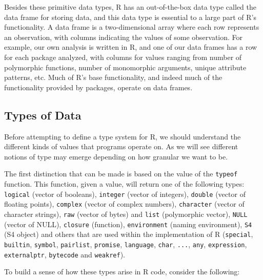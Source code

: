 \documentclass[acmsmall,10pt,review,anonymous]{acmart}\settopmatter{printfolios=true,printccs=false,printacmref=false}
\newcommand{\code}[1]{\lstinline|#1|\xspace}
\begin{document}
Besides these primitive data types, R has an out-of-the-box data type called the data frame for storing data, and this data type is essential to a large part of R's functionality.
A data frame is a two-dimensional array where each row represents an observation, with columns indicating the values of some observation.
For example, our own analysis is written in R, and one of our data frames has a row for each package analyzed, with columns for values ranging from number of polymorphic functions, number of monomorphic arguments, unique attribute patterns, etc.
Much of R's base functionality, and indeed much of the functionality provided by packages, operate on data frames.

\subsection{Types of Data}

Before attempting to define a type system for R, we should understand the
different kinds of values that programs operate on.  As we will see
different notions of type may emerge depending on how granular we want to
be.

The first distinction that can be made is based on the value of the
\code{typeof} function.  This function, given a value, will return one of
the following types: \code{logical} (vector of booleans), \code{integer}
(vector of integers), \code{double} (vector of floating points),
\code{complex} (vector of complex numbers), \code{character} (vector of
character strings), \code{raw} (vector of bytes) and \code{list}
(polymorphic vector), \code{NULL} (vector of NULL),
\code{closure} (function), \code{environment} (naming environment),
\code{S4} (S4 object) and others that are used within the implementation of
R (\code{special}, \code{builtin}, \code{symbol}, \code{pairlist},
\code{promise}, \code{language}, \code{char}, \code{...}, \code{any},
\code{expression}, \code{externalptr}, \code{bytecode} and \code{weakref}).

\AT{Some examples of use of \code{typeof}:}
To build a sense of how these types arise in R code, consider the following:
\end{document}
